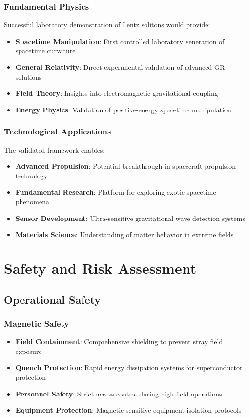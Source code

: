 \documentclass[12pt,a4paper]{article}
\begin{document}
\subsubsection{Fundamental Physics}
Successful laboratory demonstration of Lentz solitons would provide:
\begin{itemize}
\item \textbf{Spacetime Manipulation}: First controlled laboratory generation of spacetime curvature
\item \textbf{General Relativity}: Direct experimental validation of advanced GR solutions
\item \textbf{Field Theory}: Insights into electromagnetic-gravitational coupling
\item \textbf{Energy Physics}: Validation of positive-energy spacetime manipulation
\end{itemize}

\subsubsection{Technological Applications}
The validated framework enables:
\begin{itemize}
\item \textbf{Advanced Propulsion}: Potential breakthrough in spacecraft propulsion technology
\item \textbf{Fundamental Research}: Platform for exploring exotic spacetime phenomena
\item \textbf{Sensor Development}: Ultra-sensitive gravitational wave detection systems
\item \textbf{Materials Science}: Understanding of matter behavior in extreme fields
\end{itemize}

\section{Safety and Risk Assessment}

\subsection{Operational Safety}

\subsubsection{Magnetic Safety}
\begin{itemize}
\item \textbf{Field Containment}: Comprehensive shielding to prevent stray field exposure
\item \textbf{Quench Protection}: Rapid energy dissipation systems for superconductor protection
\item \textbf{Personnel Safety}: Strict access control during high-field operations
\item \textbf{Equipment Protection}: Magnetic-sensitive equipment isolation protocols
\end{itemize}
\end{document}
